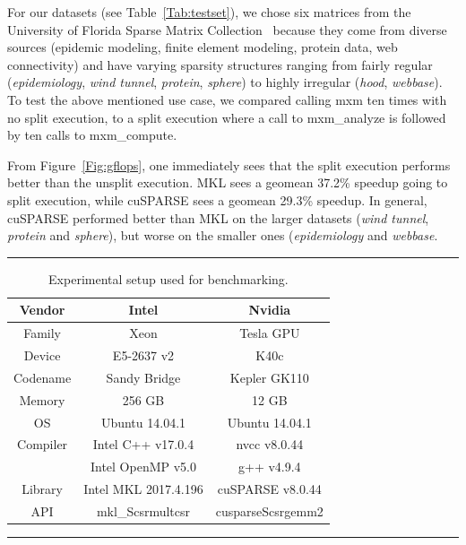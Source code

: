 For our datasets (see Table~\ref{Tab:testset}), we chose six matrices from the University of Florida Sparse Matrix Collection~\cite{davis2011university} because they come from diverse sources (epidemic modeling, finite element modeling, protein data, web connectivity) and have varying sparsity structures ranging from fairly regular (\emph{epidemiology}, \emph{wind tunnel}, \emph{protein}, \emph{sphere}) to highly irregular (\emph{hood}, \emph{webbase}). To test the above mentioned use case, we compared calling {\sf mxm} ten times with no split execution, to a split execution where a call to {\sf mxm\_analyze} is followed by ten calls to {\sf mxm\_compute}.

From Figure~\ref{Fig:gflops}, one immediately sees that the split execution performs better than the unsplit execution. MKL sees a geomean 37.2\% speedup going to split execution, while cuSPARSE sees a geomean 29.3\% speedup. In general, cuSPARSE performed better than MKL on the larger datasets (\emph{wind tunnel}, \emph{protein} and \emph{sphere}), but worse on the smaller ones (\emph{epidemiology} and \emph{webbase}.

\begin{table}[htb]
	\hrule
	\caption{Experimental setup used for benchmarking.}
	\label{Tab:testbed}
	\begin{center}
		\begin{tabular}{|c|c|c|} \hline
			Vendor & Intel & Nvidia \\ \hline
			Family & Xeon & Tesla GPU \\
			Device & E5-2637 v2 & K40c \\
			Codename & Sandy Bridge & Kepler GK110 \\
			Memory & 256 GB & 12 GB \\
			OS & Ubuntu 14.04.1 & Ubuntu 14.04.1 \\
			Compiler & Intel C++ v17.0.4 & nvcc v8.0.44 \\
			& Intel OpenMP v5.0 & g++ v4.9.4 \\
			Library & Intel MKL 2017.4.196 & cuSPARSE v8.0.44 \\ 
			API & mkl\_Scsrmultcsr & cusparseScsrgemm2 \\ \hline
		\end{tabular}
	\end{center}
	\hrule
\end{table}

